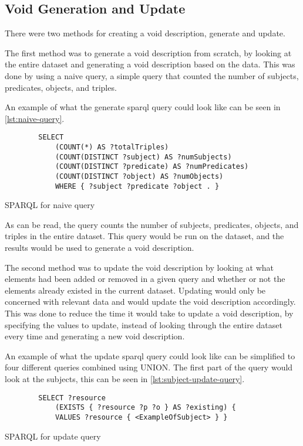 \subsection{Void Generation and Update}\label{sec:void}
There were two methods for creating a \gls{void} description, generate and update.

The first method was to generate a \gls{void} description from scratch, by looking at the entire dataset and generating a \gls{void} description based on the data. This was done by using a naive query, a simple query that counted the number of subjects, predicates, objects, and triples.

An example of what the generate \gls{sparql} query could look like can be seen in \autoref{lst:naive-query}.
\begin{listing}[!ht]
    \begin{verbatim}          
        SELECT
            (COUNT(*) AS ?totalTriples)
            (COUNT(DISTINCT ?subject) AS ?numSubjects)
            (COUNT(DISTINCT ?predicate) AS ?numPredicates)
            (COUNT(DISTINCT ?object) AS ?numObjects)
            WHERE { ?subject ?predicate ?object . }
    \end{verbatim}
    \caption{SPARQL for naive query}
    \label{lst:naive-query}
\end{listing}

As can be read, the query counts the number of subjects, predicates, objects, and triples in the entire dataset. This query would be run on the dataset, and the results would be used to generate a \gls{void} description.


The second method was to update the \gls{void} description by looking at what elements had been added or removed in a given query and whether or not the elements already existed in the current dataset. Updating would only be concerned with relevant data and would update the \gls{void} description accordingly. This was done to reduce the time it would take to update a \gls{void} description, by specifying the values to update, instead of looking through the entire dataset every time and generating a new \gls{void} description.

An example of what the update \gls{sparql} query could look like can be simplified to four different queries combined using UNION. The first part of the query would look at the subjects, this can be seen in \autoref{lst:subject-update-query}.

\begin{listing}[!ht]
    \begin{verbatim}          
        SELECT ?resource
            (EXISTS { ?resource ?p ?o } AS ?existing) {
            VALUES ?resource { <ExampleOfSubject> } }
    \end{verbatim}
    \caption{SPARQL for update query}
    \label{lst:subject-update-query}
\end{listing}


